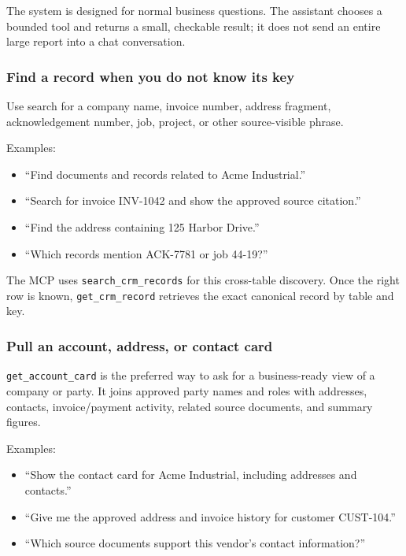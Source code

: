 \documentclass[
]{article}
\providecommand{\tightlist}{%
  \setlength{\itemsep}{0pt}\setlength{\parskip}{0pt}}
\begin{document}
The system is designed for normal business questions. The assistant
chooses a bounded tool and returns a small, checkable result; it does
not send an entire large report into a chat conversation.

\subsubsection{Find a record when you do not know its
key}\label{find-a-record-when-you-do-not-know-its-key}

Use search for a company name, invoice number, address fragment,
acknowledgement number, job, project, or other source-visible phrase.

Examples:

\begin{itemize}
\tightlist
\item
  ``Find documents and records related to Acme Industrial.''
\item
  ``Search for invoice INV-1042 and show the approved source citation.''
\item
  ``Find the address containing 125 Harbor Drive.''
\item
  ``Which records mention ACK-7781 or job 44-19?''
\end{itemize}

The MCP uses \texttt{search\_\allowbreak{}crm\_\allowbreak{}records} for
this cross-table discovery. Once the right row is known,
\texttt{get\_\allowbreak{}crm\_\allowbreak{}record} retrieves the exact
canonical record by table and key.

\subsubsection{Pull an account, address, or contact
card}\label{pull-an-account-address-or-contact-card}

\texttt{get\_\allowbreak{}account\_\allowbreak{}card} is the preferred
way to ask for a business-ready view of a company or party. It joins
approved party names and roles with addresses, contacts, invoice/payment
activity, related source documents, and summary figures.

Examples:

\begin{itemize}
\tightlist
\item
  ``Show the contact card for Acme Industrial, including addresses and
  contacts.''
\item
  ``Give me the approved address and invoice history for customer
  CUST-104.''
\item
  ``Which source documents support this vendor's contact information?''
\end{itemize}
\end{document}
